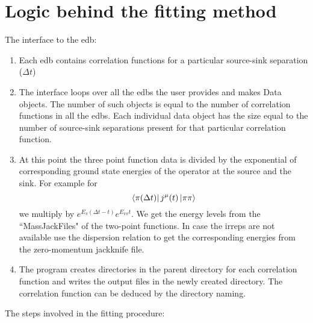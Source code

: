 \documentclass[10pt]{article}
\begin{document}
\section{Logic behind the fitting method}
The interface to the edb:\\
\begin{enumerate}
  \item Each edb contains correlation functions for a particular source-sink separation ($\Delta t$) 
  \item The interface loops over all the edbs the user provides and makes Data objects. The number of such objects is equal to the number of correlation functions in all the edbs. Each individual data object has the size equal to the number of source-sink separations present for that particular correlation function.
  \item At this point the three point function data is divided by the exponential of corresponding ground state energies of the operator at the source and the sink. For example for
	\begin{equation}
		\bra{\pi(\Delta t)}j^\mu(t)\ket{\pi\pi} 
	\end{equation}
  we multiply by $ e^{ E_{\pi} (\Delta t - t) } e^{ E_{\pi \pi}  t }$. We get the energy levels from the ``MassJackFiles" of the two-point functions. In case the irreps are not available use the dispersion relation to get the corresponding energies from the zero-momentum jackknife file.
  \item The program creates directories in the parent directory for each correlation function and writes the output files in the newly created directory. The correlation function can be deduced by the directory naming.
\end{enumerate}
The steps involved in the fitting procedure:\\
\end{document}
